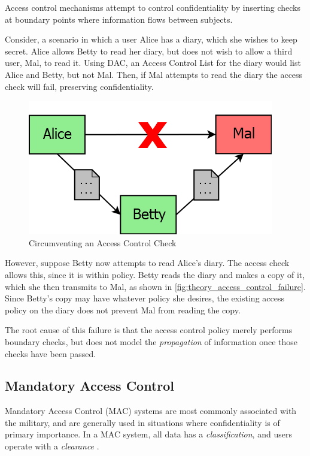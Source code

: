 Access control mechanisms attempt to control confidentiality by inserting checks at boundary points where information flows between subjects.

Consider, a scenario in which a user Alice has a diary, which she wishes to keep secret. Alice allows Betty to read her diary, but does not wish to allow a third user, Mal, to read it. Using DAC, an Access Control List for the diary would list Alice and Betty, but not Mal. Then, if Mal attempts to read the diary the access check will fail, preserving confidentiality.

\begin{figure}[h!]
	\centering
	\includegraphics[scale=0.5]{content/lit_theory/access_control_example.png}
	\caption{Circumventing an Access Control Check}
	\label{fig:theory_access_control_failure}
\end{figure}

However, suppose Betty now attempts to read Alice's diary. The access check allows this, since it is within policy. Betty reads the diary and makes a copy of it, which she then transmits to Mal, as shown in \autoref{fig:theory_access_control_failure}. Since Betty's copy may have whatever policy she desires, the existing access policy on the diary does not prevent Mal from reading the copy.

The root cause of this failure is that the access control policy merely performs boundary checks, but does not model the \textit{propagation} of information once those checks have been passed.

\subsection{Mandatory Access Control} \label{accesscontrol_mac}

Mandatory Access Control (MAC) systems are most commonly associated with the military, and are generally used in situations where confidentiality is of primary importance. In a MAC system, all data has a \textit{classification}, and users operate with a \textit{clearance} \cite{sandhu1994access}. 

